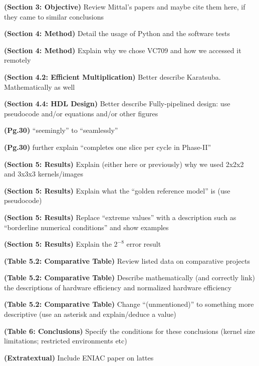 \documentclass[normalnum]{politex}
\newcommand{\cmark}{\ding{51}}%
\newcommand{\xmark}{\ding{55}}%
\newcommand{\done}{\rlap{$\square$}{\raisebox{2pt}{\large\hspace{1pt}\cmark}}%
\hspace{-2.5pt}}
\newcommand{\wontfix}{\rlap{$\square$}{\large\hspace{1pt}\xmark}}
\begin{document}
\begin{todolist}
  \item[\done] \textbf{(Section 3: Objective)} Review Mittal's papers and maybe cite them here, if they came to similar conclusions
  \item[\done] \textbf{(Section 4: Method)} Detail the usage of Python and the software tests
  \item[\done] \textbf{(Section 4: Method)} Explain why we chose VC709 and how we accessed it remotely
  \item[\done] \textbf{(Section 4.2: Efficient Multiplication)} Better describe Karatsuba. Mathematically as well
  \item[\done] \textbf{(Section 4.4: HDL Design)} Better describe Fully-pipelined design: use pseudocode and/or equations and/or other figures 
  \item[\done] \textbf{(Pg.30)} ``seemingly'' to ``seamlessly''
  \item[\done] \textbf{(Pg.30)} further explain ``completes one slice per cycle in Phase-II''
  \item[\done] \textbf{(Section 5: Results)} Explain (either here or previously) why we used 2x2x2 and 3x3x3 kernels/images
  \item[\done] \textbf{(Section 5: Results)} Explain what the ``golden reference model'' is (use pseudocode)
  \item[\done] \textbf{(Section 5: Results)} Replace ``extreme values'' with a description such as ``borderline numerical conditions'' and show examples
  \item[\done] \textbf{(Section 5: Results)} Explain the $2^{-8}$ error result
  \item[\done] \textbf{(Table 5.2: Comparative Table)} Review listed data on comparative projects
  \item[\done] \textbf{(Table 5.2: Comparative Table)} Describe mathematically (and correctly link) the descriptions of hardware efficiency and normalized hardware efficiency
  \item[\wontfix] \textbf{(Table 5.2: Comparative Table)} Change ``(unmentioned)'' to something more descriptive (use an asterisk and explain/deduce a value)
  \item[\done] \textbf{(Table 6: Conclusions)} Specify the conditions for these conclusions (kernel size limitations; restricted environments etc)
  \item \textbf{(Extratextual)} Include ENIAC paper on lattes

\end{todolist}
\end{document}
